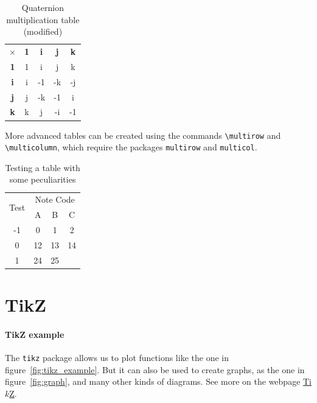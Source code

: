 \documentclass[10pt]{article}
\begin{document}
\begin{table}[h]
    \centering
    \begin{tabular}{c|cc|c|c}
        \hline
         $\times$ & \textbf{1} & \textbf{i} & \textbf{j} & \textbf{k} \\

        \textbf{1} & 1 & i & j & k \\
        \hline
        \textbf{i} & i & -1 & -k & -j \\
        \hline
        \textbf{j} & j & -k & -1 & i \\

        \textbf{k} & k & j & -i & -1 \\
        \hline
    \end{tabular}
    \caption{Quaternion multiplication table (modified)}
    \label{tab:quaternions_modified}
\end{table}


More advanced tables can be created using the commands \verb|\multirow| and \verb|\multicolumn|, which require the packages \verb|multirow| and \verb|multicol|.

\begin{table}[h!]
    \centering
    \begin{tabular}{ |c|c|c|c| }
    	\hline
    	\multirow{2}{*}{Test} & \multicolumn{3}{c|}{Note Code} \\
    	\cline{2-4}
    	& A & B & C \\
    	\hline
    	-1 & 0 & 1 & 2 \\
    	\hline
    	0 & 12 & 13 & 14 \\
    	\hline
    	1 & 24 & 25 \\
        \cline{0-2}
    \end{tabular}
    \caption{Testing a table with some peculiarities}
    \label{tab:table_multi} %
\end{table}



\section{TikZ}
\label{sec:tikz}

\paragraph*{TikZ example} The \verb|tikz| package allows us to plot functions like the one in figure~\ref{fig:tikz_example}. But it can also be used to create graphs, as the one in figure~\ref{fig:graph}, and many other kinds of diagrams. See more on the webpage \href{https://tikz.dev/}{Ti$k$Z}.
\end{document}
